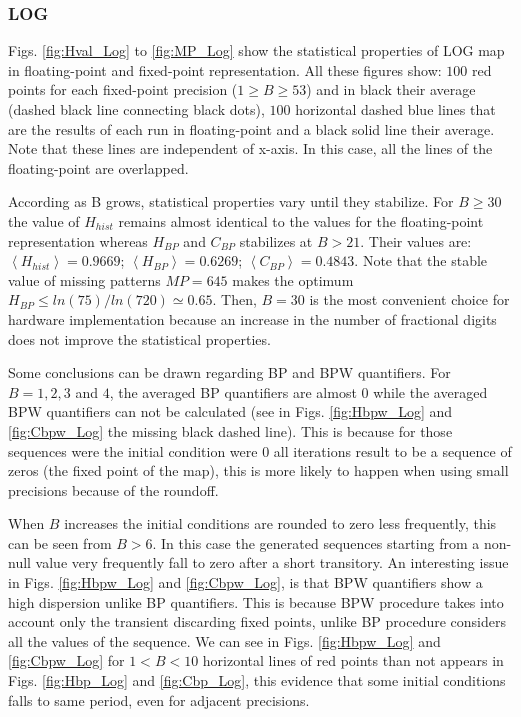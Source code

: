 \subsubsection{LOG} \label{subsubsec:log}

Figs. \ref{fig:Hval_Log} to \ref{fig:MP_Log} show the statistical properties of LOG map in floating-point and fixed-point representation.
All these figures show: $100$ red points for each fixed-point precision ($1\geq B \geq 53$) and in black their average (dashed black line connecting black dots), $100$ horizontal dashed blue lines that are the results of each run in floating-point and a black solid line their average.
Note that these lines are independent of x-axis.
In this case, all the lines of the floating-point are overlapped.

According as B grows, statistical properties vary until they stabilize.
For $B\geq 30$ the value of $H_{hist}$ remains almost identical to the values for the floating-point representation whereas $H_{BP}$ and $C_{BP}$ stabilizes at $B>21$.
Their values are: $\left\langle H_{hist}\right\rangle =0.9669$; $\left\langle H_{BP}\right\rangle =0.6269$; $\left\langle C_{BP}\right\rangle=0.4843$.
Note that the stable value of missing patterns $MP=645$ makes the optimum $H_{BP} \leq ln(75)/ln(720) \simeq 0.65$.
Then, $B=30$ is the most convenient choice for hardware implementation because an increase in the number of fractional digits does not improve the statistical properties.

Some conclusions can be drawn regarding BP and BPW quantifiers.
For $B=1, 2, 3$ and $4$, the averaged BP quantifiers are almost $0$ while the averaged BPW quantifiers can not be calculated (see in Figs. \ref{fig:Hbpw_Log} and \ref{fig:Cbpw_Log} the missing black dashed line).
This is because for those sequences were the initial condition were $0$ all iterations result to be a sequence of zeros (the fixed point of the map), this is more likely to happen when using small precisions because of the roundoff.

When $B$ increases the initial conditions are rounded to zero less frequently, this can be seen from $B>6$.
In this case the generated sequences starting from a non-null value very frequently fall to zero after a short transitory.
An interesting issue in Figs. \ref{fig:Hbpw_Log} and \ref{fig:Cbpw_Log}, is that BPW quantifiers show a high dispersion unlike BP quantifiers.
This is because BPW procedure takes into account only the transient discarding fixed points, unlike BP procedure considers all the values of the sequence.
We can see in Figs. \ref{fig:Hbpw_Log} and \ref{fig:Cbpw_Log} for $1<B<10$ horizontal lines of red points than not appears in Figs. \ref{fig:Hbp_Log} and \ref{fig:Cbp_Log}, this evidence that some initial conditions falls to same period, even for adjacent precisions.

